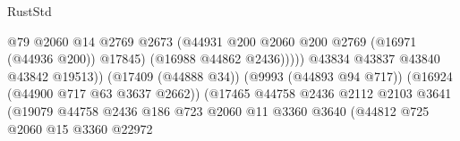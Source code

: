 \begin{lexlean}{RustStd}
\begin{coremodule}
                                                            @79
                                                            @2060
                                                            @14
                                                            @2769
                                                            @2673
                                                            (@44931
                                                              @200
                                                              @2060
                                                              @200
                                                              @2769
                                                              (@16971 (@44936 @200))
                                                              @17845)
                                                            (@16988 @44862 @2436)))))
                                                    @43834
                                                    @43837
                                                    @43840
                                                    @43842
                                                    @19513))
                                                (@17409 (@44888 @34))
                                                (@9993 (@44893 @94 @717))
                                                (@16924 (@44900 @717 @63 @3637 @2662))
                                                (@17465
                                                  @44758
                                                  @2436
                                                  @2112
                                                  @2103
                                                  @3641
                                                  (@19079
                                                    @44758
                                                    @2436
                                                    @186
                                                    @723
                                                    @2060
                                                    @11
                                                    @3360
                                                    @3640
                                                    (@44812
                                                      @725
                                                      @2060
                                                      @15
                                                      @3360
                                                      @22972

\end{coremodule}
\end{lexlean}
